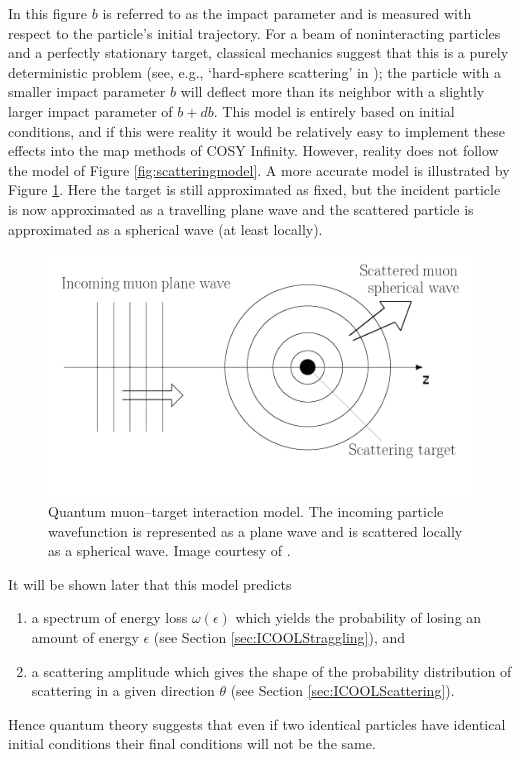 In this figure $b$ is referred to as the impact parameter and is measured with respect to the particle's initial trajectory. For a beam of noninteracting particles and a perfectly stationary target, classical mechanics suggest that this is a purely deterministic problem (see, e.g., `hard-sphere scattering' in \cite{griffithsqm}); the particle with a smaller impact parameter $b$ will deflect more than its neighbor with a slightly larger impact parameter of $b+db$. This model is entirely based on initial conditions, and if this were reality it would be relatively easy to implement these effects into the map methods of COSY Infinity. However, reality does not follow the model of Figure \ref{fig:scatteringmodel}. A more accurate model is illustrated by Figure \ref{fig:scatteringmodel2}. Here the target is still approximated as fixed, but the incident particle is now approximated as a travelling plane wave and the scattered particle is approximated as a spherical wave (at least locally).
\begin{figure}
  \centering
    \includegraphics[width=\textwidth]{Figures/scattering_model_2} 
  \caption[Quantum muon--target interaction model.]{Quantum muon--target interaction model. The incoming particle wavefunction is represented as a plane wave and is scattered locally as a spherical wave. Image courtesy of \cite{griffithsqm}.}
  \label{fig:scatteringmodel2}
\end{figure}
It will be shown later that this model predicts 
\begin{enumerate}
\item a spectrum of energy loss $\omega(\epsilon)$ which yields the probability of losing an amount of energy $\epsilon$ (see Section \ref{sec:ICOOLStraggling}), and
\item a scattering amplitude which gives the shape of the probability distribution of scattering in a given direction $\theta$ (see Section \ref{sec:ICOOLScattering}).
\end{enumerate}
Hence quantum theory suggests that even if two identical particles have identical initial conditions their final conditions will not be the same.

